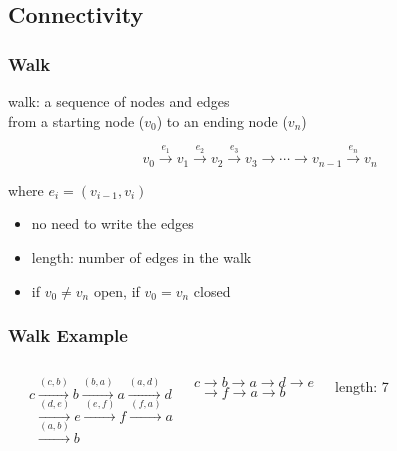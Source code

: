 \documentclass[dvipsnames]{beamer}
\begin{document}
\subsection{Connectivity}

\begin{frame}
  \frametitle{Walk}

  \begin{definition}
    \alert{walk}: a sequence of nodes and edges\\
      from a starting node ($v_0$) to an ending node ($v_n$)

    \[
      v_0 \xrightarrow{e_1} v_1 \xrightarrow{e_2} v_2 \xrightarrow{e_3} v_3
      \xrightarrow{} \cdots \xrightarrow{} v_{n-1} \xrightarrow{e_n} v_n
    \]

    where $e_i=(v_{i-1},v_i)$
  \end{definition}

  \pause
  \begin{itemize}
    \item no need to write the edges

    \medskip
    \item \alert{length}: number of edges in the walk
    \item if $v_0 \neq v_n$ \alert{open}, if $v_0 = v_n$ \alert{closed}
  \end{itemize}
\end{frame}

\begin{frame}
  \frametitle{Walk Example}

  \begin{example}
    \begin{columns}
      \begin{center}
      \end{center}

      $c \xrightarrow{(c,b)} b \xrightarrow{(b,a)} a \xrightarrow{(a,d)} d$\\
      $~~\xrightarrow{(d,e)} e \xrightarrow{(e,f)} f \xrightarrow{(f,a)} a$\\
      $~~\xrightarrow{(a,b)} b$

      \medskip
      $c \rightarrow b \rightarrow a \rightarrow d \rightarrow e$\\
      $~~\rightarrow f \rightarrow a \rightarrow b$

      \bigskip
      length: 7
    \end{columns}
  \end{example}
\end{frame}
\end{document}
